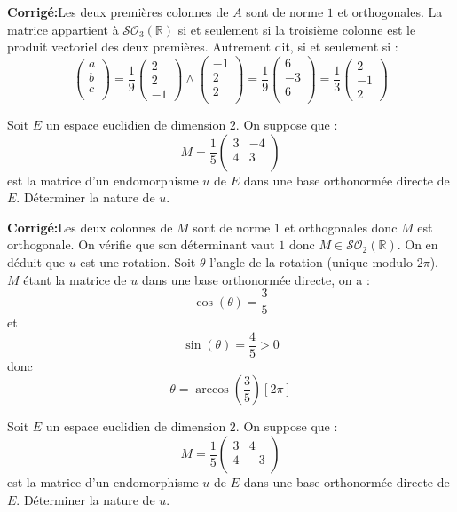 \documentclass[a4paper,twoside,french,11pt]{VcCours}
\newcommand{\corr}{\textbf{Corrigé:}}
\begin{document}
\corr Les deux premières colonnes de $A$ sont de norme $1$ et orthogonales. La matrice appartient à $\mathcal{SO}_3(\mathbb{R})$ si et seulement si la troisième colonne est le produit vectoriel des deux premières. Autrement dit, si et seulement si :
$$ \begin{pmatrix}
a \\
b \\
c \\
\end{pmatrix} = \dfrac{1}{9} \begin{pmatrix}
2 \\
2 \\
-1
\end{pmatrix} \wedge \begin{pmatrix}
-1 \\
2 \\
2 \\
\end{pmatrix} = \dfrac{1}{9} \begin{pmatrix}
6 \\
-3  \\
6 \\
\end{pmatrix} = \dfrac{1}{3} \begin{pmatrix}
2 \\
-1 \\
2
\end{pmatrix}$$

\begin{Exercice}{} Soit $E$ un espace euclidien de dimension $2$. On suppose que :
$$ M = \dfrac{1}{5} \begin{pmatrix}
3 & -4 \\
4 & 3 \\
\end{pmatrix}$$
est la matrice d'un endomorphisme $u$ de $E$ dans une base orthonormée directe de $E$. Déterminer la nature de $u$.
\end{Exercice}

\corr Les deux colonnes de $M$ sont de norme $1$ et orthogonales donc $M$ est orthogonale. On vérifie que son déterminant vaut $1$ donc $M \in \mathcal{SO}_2(\mathbb{R})$. On en déduit que $u$ est une rotation. Soit $\theta$ l'angle de la rotation (unique modulo $2 \pi$). $M$ étant la matrice de $u$ dans une base orthonormée directe, on a :
$$ \cos(\theta)= \dfrac{3}{5}$$
et 
$$ \sin(\theta) = \dfrac{4}{5}>0$$
donc
$$ \theta = \arccos\left( \dfrac{3}{5} \right) [2 \pi]$$

\begin{Exercice}{} Soit $E$ un espace euclidien de dimension $2$. On suppose que :
$$ M = \dfrac{1}{5} \begin{pmatrix}
3 & 4 \\
4 & -3 \\
\end{pmatrix}$$
est la matrice d'un endomorphisme $u$ de $E$ dans une base orthonormée directe de $E$. Déterminer la nature de $u$.
\end{Exercice}
\end{document}
